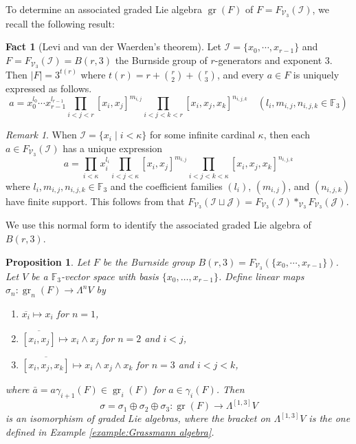 \documentclass[11pt,reqno]{article}
\newtheorem{proposition}[theorem]{Proposition}
\theoremstyle{definition}
\newtheorem{fact}[theorem]{Fact}
\theoremstyle{remark}
\newtheorem{remark}[theorem]{Remark}
\DeclareMathOperator{\gr}{gr}
\begin{document}
To determine an associated graded Lie algebra $\gr(F)$ of $F=F_{\mathcal V_3}(\mathcal I)$, we recall the following result:
\begin{fact}[Levi and van der Waerden's theorem]\label{fact:Levi and van der Waerden}
    Let $\mathcal I=\{x_0,\cdots, x_{r-1}\}$ and $F=F_{\mathcal V_3}(\mathcal I)=B(r,3)$ the Burnside group of $r$-generators and exponent $3$. Then $|F|=3^{t(r)}$ where $t(r)=r + \binom r2 + \binom r3$, and every $a\in F$ is uniquely expressed as follows.
    \[
    a=x_0^{l_0}\cdots x_{r-1}^{l_{r-1}}
    \prod_{i<j<r}[x_i,x_j]^{m_{i,j}}
    \prod_{i<j<k<r}[x_i,x_j,x_k]^{n_{i,j,k}}
    \quad (l_i,m_{i,j},n_{i,j,k}\in\mathbb F_3)
    \]
\end{fact}

\begin{remark}\label{remark:infinite dim}
    When $\mathcal I=\{x_i\mid i< \kappa\}$ for some infinite cardinal $\kappa$, then each $a\in F_{\mathcal V_3}(\mathcal I)$ has a unique expression
    \[
    a=\prod_{i<\kappa} x_i^{l_i}
    \prod_{i<j<\kappa}[x_i,x_j]^{m_{i,j}}
    \prod_{i<j<k<\kappa}[x_i,x_j,x_k]^{n_{i,j,k}}
    \]
    where $l_i,m_{i,j},n_{i,j,k}\in\mathbb F_3$ and the coefficient families
    $(l_i)$, $(m_{i,j})$, and $(n_{i,j,k})$ have finite support.
    This follows from that $F_{\mathcal V_3}(\mathcal I\sqcup \mathcal J)=F_{\mathcal V_3}(\mathcal I)*_{\mathcal V_3}F_{\mathcal V_3}(\mathcal J)$.
\end{remark}

We use this normal form to identify the associated graded Lie algebra of
$B(r,3)$.

\begin{proposition}\label{proposition:gr(F) is Grassmann algebra}
    Let $F$ be the Burnside group $B(r,3)=F_{\mathcal V_3}(\{x_0,\cdots, x_{r-1}\})$.
    Let $V$ be a $\mathbb F_3$-vector space with basis
    $\{x_0,\ldots,x_{r-1}\}$.  Define linear maps
    $\sigma_n:\gr_n(F)\to\Lambda^nV$ by
    \begin{enumerate}
        \item $\overline{x_i}\mapsto x_i$ for $n=1$,
        \item $\overline{[x_i,x_j]}\mapsto x_i\wedge x_j$ for $n=2$ and
        $i<j$,
        \item $\overline{[x_i,x_j,x_k]}\mapsto x_i\wedge x_j\wedge x_k$
        for $n=3$ and $i<j<k$,
    \end{enumerate}
    where $\bar a=a\gamma_{i+1}(F)\in \gr_i(F)$ for $a\in\gamma_i(F)$.
    Then
    \[
    \sigma=\sigma_1\oplus\sigma_2\oplus\sigma_3:
    \gr(F)\longrightarrow\Lambda^{[1,3]}V
    \]
    is an isomorphism of graded Lie algebras, where the bracket on
    $\Lambda^{[1,3]}V$ is the one defined in Example \ref{example:Grassmann algebra}.
\end{proposition}
\end{document}
